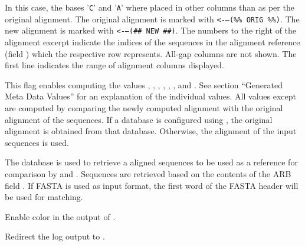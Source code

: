 \documentclass[english,a4paper]{article}
\begin{document}
\begin{Description}
In this case, the bases '\texttt{C}' and '\texttt{A}' where placed in other columns than as per the original alignment. The original alignment
is marked with \texttt{<-{}--(\%\% ORIG \%\%)}. The new alignment is marked with \texttt{<-{}--(\#\# NEW \#\#)}. The numbers 
to the right of the alignment excerpt indicate the indices of the sequences in the alignment reference (field 
) which the respective row represents. All-gap columns are not shown. The first line indicates
the range of alignment columns displayed. 
\item[\Opt{-{}-show-dist}]
This flag enables computing the values , , , , , ,  and . See section ``Generated Meta Data Values'' for an explanation of the individual values. All values except  are computed by comparing the newly computed alignment with the original alignment of the sequences. If a database is configured using , the original alignment is obtained from that database. Otherwise, the alignment of the input sequences is used. 
\item[\OptArg{-{}-orig-db }{arb database}]
The database  is used to retrieve a aligned sequences to be used as a reference for comparison by  and . Sequences are retrieved based on the contents of the ARB field . If FASTA is used as input format, the first word of the FASTA header will be used for matching. 
\item[\Opt{-{}-colors}]
Enable color in the output of .
\item[\OptArg{-{}-log-file }{filename}]
Redirect the log output to . 
\end{Description}
\end{document}
